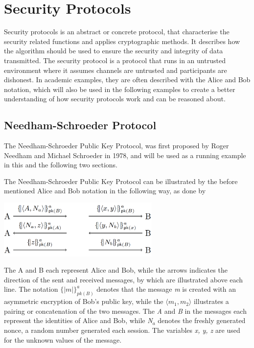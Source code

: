 \section{Security Protocols} %
Security protocols is an abstract or concrete protocol, that characterise the security related functions and applies cryptographic methods. It describes how the algorithm should be used to ensure the security and integrity of data transmitted. The security protocol is a protocol that runs in an untrusted environment where it assumes channels are untrusted and participants are dishonest. In academic examples, they are often described with the Alice and Bob notation, which will also be used in the following examples to create a better understanding of how security protocols work and can be reasoned about. 


\subsection{Needham-Schroeder Protocol}
The Needham-Schroeder Public Key Protocol, was first proposed by Roger Needham and Michael Schroeder in 1978, and will be used as a running example in this and the following two sections. %

The Needham-Schroeder Public Key Protocol can be illustrated by the before mentioned Alice and Bob notation in the following way, as done by \citeauthor{DBLP:journals/ftpl/CortierK14}

\begin{center}
\includegraphics[width=0.6\textwidth, angle=0]{Graphics/NS_Protocol.pdf}
\end{center}

The A and B each represent Alice and Bob, while the arrows indicates the direction of the sent and received messages, by which are illustrated above each line. The notation $\{| m |\}^a_{pk(B)}$ denotes that the message \textit{m} is created with an asymmetric encryption of Bob's public key, while the $\langle m_1, m_2 \rangle$ illustrates a pairing or concatenation of the two messages. The \textit{A} and \textit{B} in the messages each represent the identities of Alice and Bob, while \textit{N$_a$} denotes the freshly generated nonce, a random number generated each session. The variables \textit{x, y, z} are used for the unknown values of the message.

